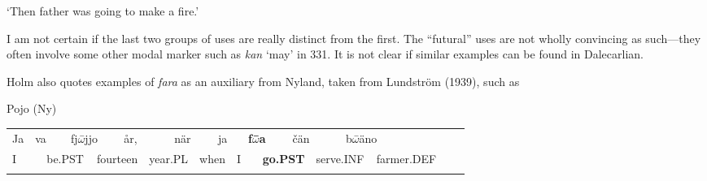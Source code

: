 \begin{styleTranslation}
‘Then father was going to make a fire.’

\end{styleTranslation}

\begin{styleBodyTextFirst}
I am not certain if the last two groups of uses are really distinct from the first. The “futural” uses are not wholly convincing as such—they often involve some other modal marker such as \textit{kan} ‘may’ in 331. It is not clear if similar examples can be found in Dalecarlian. 

\end{styleBodyTextFirst}

\begin{styleBodytextC}
Holm also quotes examples of \textit{fara} as an auxiliary from Nyland, taken from Lundström (1939), such as

\end{styleBodytextC}

\begin{listWWNumileveli}
\item {}

\begin{styleExample}
Pojo (Ny) 

\end{styleExample}

\end{listWWNumileveli}

\begin{tabular}{llllllllllllllllllll}
\lsptoprule
Ja & \multicolumn{2}{l}{va

} & \multicolumn{2}{l}{fj$\omega $\={ }jjo 

} & \multicolumn{2}{l}{år,

} & \multicolumn{2}{l}{när

} & \multicolumn{2}{l}{ja

} & \multicolumn{2}{l}{\textbf{f}\textbf{$\omega $}\textbf{\={ }a}

} & \multicolumn{2}{l}{čän

} & \multicolumn{2}{l}{b$\omega $\={ }äno 

} & \multicolumn{2}{l}{} & \\
\multicolumn{2}{l}{I

} & \multicolumn{2}{l}{be.PST

} & \multicolumn{2}{l}{fourteen

} & \multicolumn{2}{l}{year.PL

} & \multicolumn{2}{l}{when

} & \multicolumn{2}{l}{I

} & \multicolumn{2}{l}{{\bfseries go.PST}

} & \multicolumn{2}{l}{serve.INF

} & \multicolumn{2}{l}{farmer.DEF

} & \multicolumn{2}{l}{}\\
\lspbottomrule
\end{tabular}

